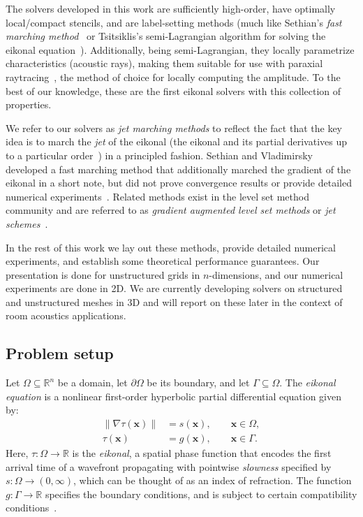 \documentclass{siamart190516}
\newcommand{\m}[1]{\boldsymbol{#1}}
\begin{document}
The solvers developed in this work are sufficiently high-order, have
optimally local/compact stencils, and are label-setting methods (much
like Sethian's \emph{fast marching method}~\cite{Sethian:1999ac} or
Tsitsiklis's semi-Lagrangian algorithm for solving the eikonal
equation~\cite{Tsitsiklis:1995aa}). Additionally, being
semi-Lagrangian, they locally parametrize characteristics (acoustic
rays), making them suitable for use with paraxial
raytracing~\cite{Popov:2002aa}, the method of choice for locally
computing the amplitude. To the best of our knowledge, these are the
first eikonal solvers with this collection of properties.

We refer to our solvers as \emph{jet marching methods} to reflect the
fact that the key idea is to march the \emph{jet} of the eikonal (the
eikonal and its partial derivatives up to a particular
order~\cite{Shilov:1971aa}) in a principled fashion. Sethian and
Vladimirsky developed a fast marching method that additionally marched
the gradient of the eikonal in a short note, but did not prove
convergence results or provide detailed numerical
experiments~\cite{Sethian:2000aa}. Related methods exist in the level
set method community and are referred to as \emph{gradient augmented
  level set methods} or \emph{jet
  schemes}~\cite{Nave:2010aa,Seibold:2011aa}.

In the rest of this work we lay out these methods, provide detailed
numerical experiments, and establish some theoretical performance
guarantees. Our presentation is done for unstructured grids in
$n$-dimensions, and our numerical experiments are done in 2D. We are
currently developing solvers on structured and unstructured meshes in
3D and will report on these later in the context of room acoustics
applications.

\subsection{Problem setup}

Let $\Omega \subseteq \mathbb{R}^n$ be a domain, let $\partial\Omega$
be its boundary, and let $\Gamma \subseteq \Omega$. The \emph{eikonal
  equation} is a nonlinear first-order hyperbolic partial differential
equation given by:
\begin{equation}\label{eq:eikonal-equation}
  \begin{split}
    \|\nabla\tau(\m{x})\| &= s(\m{x}), \qquad \m{x} \in \Omega, \\
    \tau(\m{x}) &= g(\m{x}), \qquad \m{x} \in \Gamma.
  \end{split}
\end{equation}
Here, $\tau : \Omega \to \mathbb{R}$ is the \emph{eikonal}, a spatial
phase function that encodes the first arrival time of a wavefront
propagating with pointwise \emph{slowness} specified by
$s : \Omega \to (0, \infty)$, which can be thought of as an index of
refraction. The function $g : \Gamma \to \mathbb{R}$ specifies the
boundary conditions, and is subject to certain compatibility
conditions~\cite{Bornemann:2006aa}.
\end{document}
